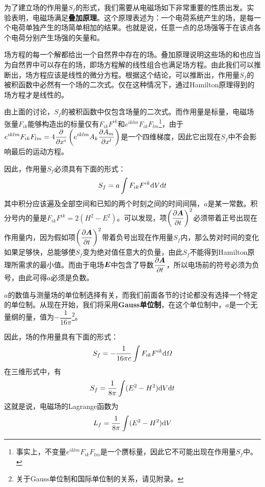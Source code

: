 为了建立场的作用量$S_f$的形式，我们需要从电磁场如下非常重要的性质出发。实验表明，电磁场满足{\bf 叠加原理}。这个原理表述为：一个电荷系统产生的场，是每一个电荷单独产生的场简单相加的结果。也就是说，任意一点的总场强等于在该点各个电荷分别产生场强的矢量和。

场方程的每一个解都给出一个自然界中存在的场。叠加原理说明这些场的和也应当为自然界中可以存在的场，即场方程解的线性组合也满足场方程。由此我们可以推断出，场方程应该是线性的微分方程。根据这个结论，可以推断出，作用量$S_f$的被积函数中必然有一个场的二次式。仅在这种情况下，通过Hamilton原理得到的场方程才是线性的。

由上面的讨论，$S_f$的被积函数中仅包含场量的二次式。而作用量是标量，电磁场张量$F_{ik}$能够构造出的标量仅有$F_{ik}F^{ik}$和$e^{iklm}F_{ik}F_{lm}$\footnote{事实上，不变量$e^{iklm}F_{ik}F_{lm}$是一个赝标量，因此它不可能出现在作用量$S_f$中。}，由于$\displaystyle e^{iklm}F_{ik}F_{lm} = 4\frac{\partial}{\partial x^i}\left(e^{iklm}A_k\frac{\partial A_m}{\partial x^l}\right)$是一个四维梯度，因此它出现在$S_f$中不会影响最后的运动方程。

因此，作用量$S_f$必须具有下面的形式：
\begin{equation*}
	S_f = a\int F_{ik}F^{ik}\mathrm{d} V\mathrm{d} t
\end{equation*}
其中积分应该遍及全部空间和已知的两个时刻之间的时间间隔，$a$是某一常数。积分号内的量是$F_{ik}F^{ik} = 2(H^2-E^2)$。可以发现，项$\left(\dfrac{\partial \boldsymbol{A}}{\partial t}\right)^2$必须带着正号出现在作用量内，因为假如项$\left(\dfrac{\partial \boldsymbol{A}}{\partial t}\right)^2$带着负号出现在作用量$S_f$内，那么势对时间的变化如果足够快，总能够使$S_f$变为绝对值任意大的负量，由此$S_f$不能得到Hamilton原理所需求的最小值。而由于电场$\boldsymbol{E}$中包含了导数$\dfrac{\partial \boldsymbol{A}}{\partial t}$，所以电场前的符号必须为负号，由此可得$a$必须是负数。

$a$的数值与测量场的单位制选择有关，而我们前面各节的讨论都没有选择一个特定的单位制。从现在开始，我们将采用{\bf Gauss单位制}，在这个单位制中，$a$是一个无量纲的量，值为$-\dfrac{1}{16\pi}$\footnote{关于Gauss单位制和国际单位制的关系，请见附录。}。

因此，场的作用量具有下面的形式：
\begin{equation}
	S_f = -\frac{1}{16\pi c}\int F_{ik}F^{ik}\mathrm{d} \varOmega
	\label{chapter4:电磁场本身的作用量}
\end{equation}
在三维形式中，有
\begin{equation}
	S_f = \frac{1}{8\pi} \int (E^2-H^2)\mathrm{d} V\mathrm{d} t
	\label{chapter4:电磁场本身的作用量-三维形式}
\end{equation}
这就是说，电磁场的Lagrange函数为
\begin{equation}
	L_f = \frac{1}{8\pi} \int (E^2-H^2)\mathrm{d} V
	\label{chapter4:电磁场本身的Lagrange函数}
\end{equation}

